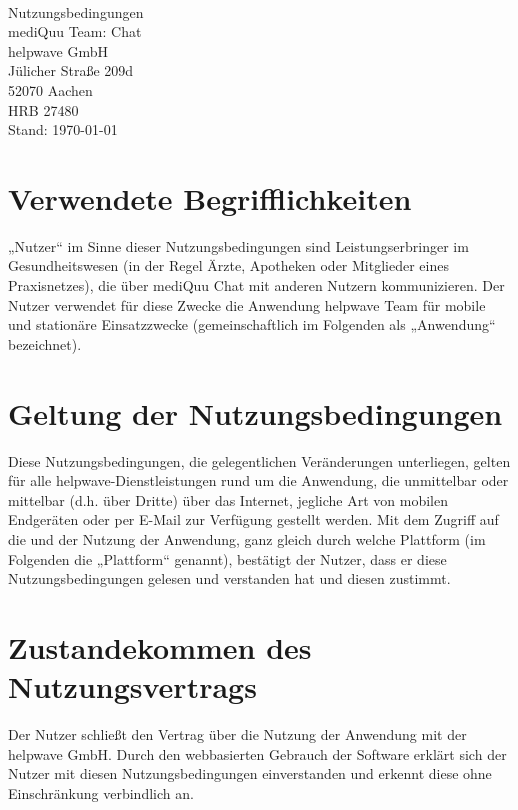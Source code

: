 \documentclass[10pt]{article}
\begin{document}
\begin{center}
	\\[4ex]
	{\Huge \sffamily
	Nutzungsbedingungen \\
	\huge mediQuu Team: Chat}\\[2ex]

	\vspace{1em}
	{\large
		helpwave GmbH \\
		Jülicher Straße 209d \\
		52070 Aachen \\
		HRB 27480}\\
	\vspace{1em}
	Stand: \today
\end{center}

\vspace{2ex}

\tableofcontents

\newpage

\section{Verwendete Begrifflichkeiten}
„Nutzer“ im Sinne dieser Nutzungsbedingungen sind Leistungserbringer im Gesundheitswesen (in der Regel Ärzte, Apotheken oder Mitglieder eines Praxisnetzes), die über mediQuu Chat mit anderen Nutzern kommunizieren. Der Nutzer verwendet
für diese Zwecke die Anwendung helpwave Team für mobile und stationäre Einsatzzwecke (gemeinschaftlich im Folgenden
als „Anwendung“ bezeichnet).

\section{Geltung der Nutzungsbedingungen}
Diese Nutzungsbedingungen, die gelegentlichen Veränderungen unterliegen, gelten für alle helpwave-Dienstleistungen
rund um die Anwendung, die unmittelbar oder mittelbar (d.h. über Dritte) über das Internet, jegliche Art von mobilen Endgeräten oder per E-Mail zur Verfügung gestellt werden.
Mit dem Zugriff auf die und der Nutzung der Anwendung, ganz gleich durch welche Plattform (im Folgenden die „Plattform“
genannt), bestätigt der Nutzer, dass er diese Nutzungsbedingungen gelesen und verstanden hat und diesen zustimmt.

\section{Zustandekommen des Nutzungsvertrags}
Der Nutzer schließt den Vertrag über die Nutzung der Anwendung mit der helpwave GmbH.
Durch den webbasierten Gebrauch der Software erklärt sich der Nutzer mit diesen Nutzungsbedingungen einverstanden und
erkennt diese ohne Einschränkung verbindlich an.
\end{document}
